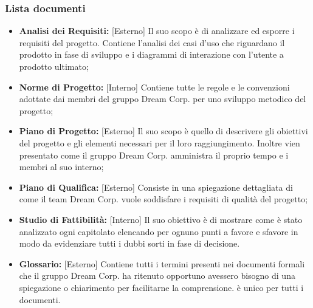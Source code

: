 		\subsubsection{Lista documenti}
		\label{3.1.5}
			\begin{itemize}
				\item \textbf{Analisi dei Requisiti: }[Esterno] \newline
				Il suo scopo è di analizzare ed esporre i requisiti del progetto. Contiene l'analisi dei casi d'uso che riguardano il prodotto in fase di sviluppo e i diagrammi di interazione con l'utente a prodotto ultimato;
				\item \textbf{Norme di Progetto: }[Interno] \newline
				Contiene tutte le regole e le convenzioni adottate dai membri del gruppo Dream Corp. per uno sviluppo metodico del progetto;
				\item \textbf{Piano di Progetto: }[Esterno] \newline
				Il suo scopo è quello di descrivere gli obiettivi del progetto e gli elementi necessari per il loro raggiungimento. Inoltre vien presentato come il gruppo Dream Corp. amministra il proprio tempo e i membri al suo interno;
				\item \textbf{Piano di Qualifica: }[Esterno] \newline
				Consiste in una spiegazione dettagliata di come il team Dream Corp. vuole soddisfare i requisiti di qualità del progetto;
				\item \textbf{Studio di Fattibilità: }[Interno] \newline
				Il suo obiettivo è di mostrare come è stato analizzato ogni capitolato elencando per ognuno punti a favore e sfavore in modo da evidenziare tutti i dubbi sorti in fase di decisione.
				\item \textbf{Glossario: }[Esterno] \newline
				Contiene tutti i termini presenti nei documenti formali che il gruppo Dream Corp. ha ritenuto opportuno avessero bisogno di una spiegazione o chiarimento per facilitarne la comprensione. è unico per tutti i documenti.
			\end{itemize}

